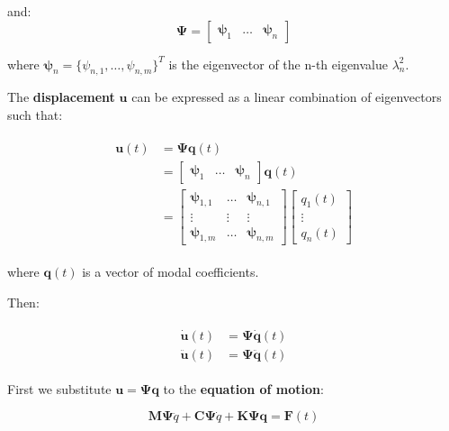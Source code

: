\documentclass[10pt,b5paper,titlepage]{book}
\newenvironment{eqarray}
{
    \begin{eqnarray}
        \begin{aligned}
}
{
        \end{aligned}
    \end{eqnarray}
}
\begin{document}
and:
\begin{equation}
    \mathbf{\Psi} =
    \begin{bmatrix}
        \mathbf{\psi}_1 & \dots & \mathbf{\psi}_n
    \end{bmatrix}
\end{equation}

where $ \mathbf{\psi}_n = \{\psi_{n,1}, \dots, \psi_{n,m}\}^T $ is the eigenvector
of the n-th eigenvalue $ \lambda_n^2 $.

The \textbf{displacement} $ \mathbf{u} $ can be expressed as a linear combination
of eigenvectors such that:

\begin{eqarray}
    \mathbf{u}(t)
    &= \mathbf{\Psi} \mathbf{q}(t) \\
    &= \begin{bmatrix}
        \mathbf{\psi}_1 & \dots & \mathbf{\psi}_n
    \end{bmatrix} \mathbf{q}(t) \\
    &= \begin{bmatrix}
        \mathbf{\psi}_{1,1} & \dots & \mathbf{\psi}_{n,1} \\
        \vdots & \vdots & \vdots \\
        \mathbf{\psi}_{1,m} & \dots & \mathbf{\psi}_{n,m}
    \end{bmatrix}
    \begin{bmatrix}
        q_1(t) \\
        \vdots \\
        q_n(t)
    \end{bmatrix}
\end{eqarray}

where $ \mathbf{q}(t) $ is a vector of modal coefficients.

Then:

\begin{eqarray}
    \dot{\mathbf{u}}(t) &= \mathbf{\Psi} \dot{\mathbf{q}}(t) \\
    \ddot{\mathbf{u}}(t) &= \mathbf{\Psi} \ddot{\mathbf{q}}(t)
\end{eqarray}

First we substitute $ \mathbf{u} = \mathbf{\Psi}\mathbf{q} $ to the
\textbf{equation of motion}:

\begin{equation}
    \mathbf{M} \mathbf{\Psi} \ddot{q} +
    \mathbf{C} \mathbf{\Psi} \dot{q} +
    \mathbf{K}\mathbf{\Psi}\mathbf{q}
    = \mathbf{F}(t)
\end{equation}
\end{document}
